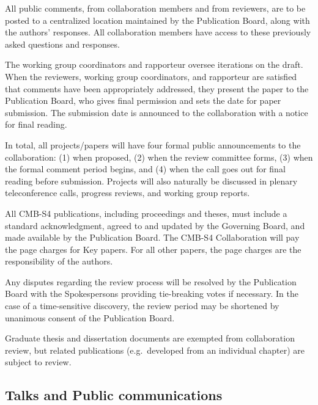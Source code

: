 All public comments, from collaboration members and from reviewers, are to be posted to a centralized location maintained by the Publication Board, along with the authors' responses.  All collaboration members have access to these previously asked questions and responses.

The working group coordinators and rapporteur oversee iterations on the draft.  When the reviewers, working group coordinators, and rapporteur are satisfied that comments have been appropriately addressed, they present the paper to the Publication Board, who gives final permission and sets the date for paper submission.  The submission date is announced to the collaboration with a notice for final reading.  

In total, all projects/papers will have four formal public announcements to the collaboration:
(1) when proposed,
(2) when the review committee forms,
(3) when the formal comment period begins, and
(4) when the call goes out for final reading before submission.
  Projects will also naturally be discussed in plenary teleconference calls, progress reviews, and working group reports.

All CMB-S4 publications, including proceedings and theses, must include a standard acknowledgment, agreed to and updated by the Governing Board, and made available by the Publication Board.  The CMB-S4 Collaboration will pay the page charges for Key papers. For all other papers, the page charges are the responsibility of the authors.

Any disputes regarding the review process will be resolved by the Publication Board with the Spokespersons providing tie-breaking votes if necessary. In the case of a time-sensitive discovery, the review period may be shortened by unanimous consent of the Publication Board.

Graduate thesis and dissertation documents are exempted from collaboration review, but related publications (e.g.~developed from an individual chapter) are subject to review.

\subsection{Talks and Public communications}

